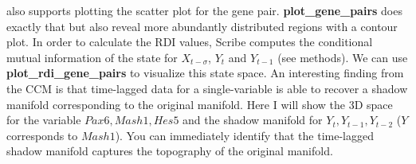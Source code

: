 \documentclass[10pt,oneside]{article}\usepackage[]{graphicx}\usepackage[]{color}
\begin{document}
 also supports plotting the scatter plot for the gene pair. \textbf{plot\_gene\_pairs} does exactly that but also reveal more abundantly distributed regions with a contour plot. In order to calculate the RDI values, Scribe computes the conditional mutual information of the state for $X_{t - \sigma}$, $Y_t$ and $Y_{t - 1}$ (see methods). We can use \textbf{plot\_rdi\_gene\_pairs} to visualize this state space. An interesting finding from the CCM is that time-lagged data for a single-variable is able to recover a shadow manifold corresponding to the original manifold. Here I will show the 3D space for the variable $Pax6, Mash1, Hes5$ and the shadow manifold for $Y_t, Y_{t - 1}, Y_{t - 2}$ ($Y$ corresponds to $Mash1$). You can immediately identify that the time-lagged shadow manifold captures the topography of the original manifold.
\end{document}
